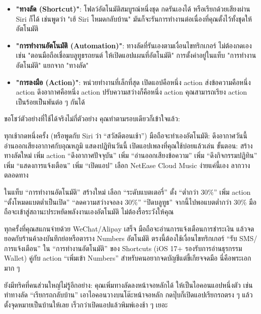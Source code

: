 \begin{itemize}
  \item \textbf{"ทางลัด (Shortcut)"}: โฟลว์อัตโนมัติสมบูรณ์หนึ่งชุด กดรันเองได้ หรือเรียกด้วยเสียงผ่าน Siri ก็ได้ เช่นพูดว่า "เฮ้ Siri โหมดกลับบ้าน" มันก็จะรันการทำงานต่อเนื่องที่คุณตั้งไว้ทั้งชุดให้อัตโนมัติ
  \item \textbf{"การทำงานอัตโนมัติ (Automation)"}: ทางลัดที่รันเองตามเงื่อนไขทริกเกอร์ ไม่ต้องกดเอง เช่น "ตอนมือถือเชื่อมบลูทูธรถยนต์ ให้เปิดแอปแผนที่อัตโนมัติ" การตั้งค่าอยู่ในแท็บ "การทำงานอัตโนมัติ" แยกจาก "ทางลัด"
  \item \textbf{"การลงมือ (Action)"}: หน่วยทำงานที่เล็กที่สุด เปิดแอปคือหนึ่ง action ส่งข้อความคือหนึ่ง action ดึงอากาศคือหนึ่ง action ปรับความสว่างก็คือหนึ่ง action คุณสามารถเรียง action เป็นร้อยเป็นพันต่อ ๆ กันได้
\end{itemize}

ขอโชว์ตัวอย่างที่ใช้ได้จริงไม่กี่ตัวอย่าง คุณทำตามรอบเดียวก็เข้าใจแล้ว:


ทุกเช้ากดหนึ่งครั้ง (หรือพูดกับ Siri ว่า “สวัสดีตอนเช้า”) มือถือจะทำเองอัตโนมัติ: ดึงอากาศวันนี้ อ่านออกเสียงอากาศกับอุณหภูมิ แสดงปฏิทินวันนี้ เปิดแอปเพลงที่คุณใช้บ่อยแล้วเล่น ขั้นตอน: สร้างทางลัดใหม่ เพิ่ม action “ดึงอากาศปัจจุบัน” เพิ่ม “อ่านออกเสียงข้อความ” เพิ่ม “ดึงกิจกรรมปฏิทิน” เพิ่ม “แสดงการแจ้งเตือน” เพิ่ม “เปิดแอป” เลือก NetEase Cloud Music ง่ายแค่นี้เอง ลากวางตลอดทาง


ในแท็บ “การทำงานอัตโนมัติ” สร้างใหม่ เลือก “ระดับแบตเตอรี่” ตั้ง “ต่ำกว่า 30\%” เพิ่ม action “ตั้งโหมดแบตต่ำเป็นเปิด” “ลดความสว่างจอลง 30\%” “ปิดบลูทูธ” จากนี้ไปพอแบตต่ำกว่า 30\% มือถือจะเข้าสู่สถานะประหยัดพลังงานเองอัตโนมัติ ไม่ต้องรื้อระวังให้คุณ


ทุกครั้งที่คุณสแกนจ่ายด้วย WeChat/Alipay เสร็จ มือถือจะอ่านการแจ้งเตือนการชำระเงิน แล้วจดยอดกับร้านค้าลงบันทึกย่อหรือตาราง Numbers อัตโนมัติ ตรงนี้ต้องใช้เงื่อนไขทริกเกอร์ “รับ SMS/การแจ้งเตือน” ใน “การทำงานอัตโนมัติ” ของ Shortcuts (iOS 17+ รองรับการอ่านธุรกรรม Wallet) คู่กับ action “เพิ่มเข้า Numbers” สำหรับคนอยากจดบัญชีแต่ขี้เกียจจดมือ นี่คือพระเอกมาก ๆ

ยังมีทริคที่คนส่วนใหญ่ไม่รู้อีกอย่าง: คุณเพิ่มทางลัดลงหน้าจอหลักได้ ให้เป็นไอคอนแอปหนึ่งตัว เช่นทำทางลัด “เรียกรถกลับบ้าน” เอาไอคอนวางบนโต๊ะหน้าจอหลัก กดปุ๊บก็เปิดแอปเรียกรถตรง ๆ แล้วตั้งจุดหมายเป็นบ้านให้เลย เร็วกว่าเปิดแอปแล้วพิมพ์เองช้า ๆ เยอะ

